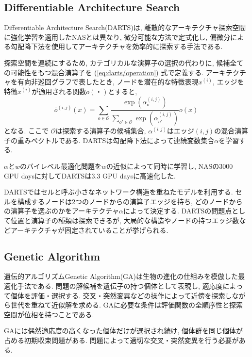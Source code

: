 \documentclass[twocolumn]{jarticle}     %
\begin{document}
\subsection{Differentiable Architecture Search}
Differentiable Architecture Search(DARTS)\cite{DBLP:journals/corr/abs-1806-09055}は,
離散的なアーキテクチャ探索空間に強化学習を適用したNASとは異なり,
微分可能な方法で定式化し,
偏微分による勾配降下法を使用してアーキテクチャを効率的に探索する手法である.

探索空間を連続にするため, カテゴリカルな演算子の選択の代わりに, 候補全ての可能性をもつ混合演算子を
(\ref{eq:darts/operation}) 式で定義する.
アーキテクチャを有向非巡回グラフで表したとき, ノードを潜在的な特徴表現$x^{(i)}$,
エッジを特徴$x^{(i)}$が適用される関数$o(・)$とすると,
\begin{equation}
  \label{eq:darts/operation}
  \bar{o}^{(i, j)}(x) = \sum_{o \in \mathcal{O}} \frac{\exp(\alpha^{(i, j)}_o)}{\sum_{o' \in \mathcal{O}} \exp(\alpha^{(i, j)}_{o'})} o(x)
\end{equation}
となる. ここで
$\mathcal{O}$は探索する演算子の候補集合,
$\alpha^{(i, j)}$はエッジ$(i, j)$の混合演算子の重みベクトルである.
DARTSは勾配降下法によって連続変数集合$\alpha$を学習する.

$\alpha$と$w$のバイレベル最適化問題を$w$の近似によって同時に学習し,
NASの3000 GPU daysに対してDARTSは3.3 GPU daysに高速化した.

DARTSではセルと呼ぶ小さなネットワーク構造を重ねたモデルを利用する.
セルを構成するノードは2つのノードからの演算子エッジを持ち,
どのノードからの演算子を選ぶのかをアーキテクチャ$\alpha$によって決定する.
DARTSの問題点として位置と演算子の種類は探索できるが,
大局的な構造やノードの持つエッジ数などアーキテクチャが固定されていることが挙げられる.

\subsection{Genetic Algorithm}
遺伝的アルゴリズムGenetic Algorithm(GA)は生物の進化の仕組みを模倣した最適化手法である.
問題の解候補を遺伝子の持つ個体として表現し, 適応度によって個体を評価・選択する.
交叉・突然変異などの操作によって近傍を探索しながら世代を重ねて近似解を求める.
GAに必要な条件は評価関数の全順序性と探索空間が位相を持つことである.


GAには偶然適応度の高くなった個体だけが選択され続け,
個体群を同じ個体が占める初期収束問題がある.
問題によって適切な交叉・突然変異を行う必要がある.
\end{document}
